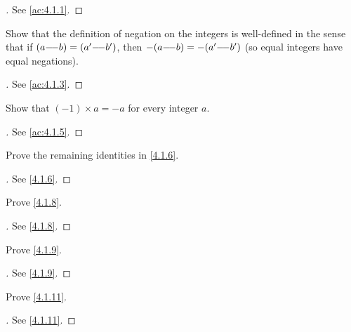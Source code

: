 \begin{proof}[]
  See \cref{ac:4.1.1}.
\end{proof}

\begin{ex}\label{ex:4.1.2}
  Show that the definition of negation on the integers is well-defined in the sense that if \((a {-}\!{-} b) = (a' {-}\!{-} b')\), then \(-(a {-}\!{-} b) = -(a' {-}\!{-} b')\)
  (so equal integers have equal negations).
\end{ex}

\begin{proof}[]
  See \cref{ac:4.1.3}.
\end{proof}

\begin{ex}\label{ex:4.1.3}
  Show that \((-1) \times a = -a\) for every integer \(a\).
\end{ex}

\begin{proof}[]
  See \cref{ac:4.1.5}.
\end{proof}

\begin{ex}\label{ex:4.1.4}
  Prove the remaining identities in \cref{4.1.6}.
\end{ex}

\begin{proof}[]
  See \cref{4.1.6}.
\end{proof}

\begin{ex}\label{ex:4.1.5}
  Prove \cref{4.1.8}.
\end{ex}

\begin{proof}[]
  See \cref{4.1.8}.
\end{proof}

\begin{ex}\label{ex:4.1.6}
  Prove \cref{4.1.9}.
\end{ex}

\begin{proof}[]
  See \cref{4.1.9}.
\end{proof}

\begin{ex}\label{ex:4.1.7}
  Prove \cref{4.1.11}.
\end{ex}

\begin{proof}[]
  See \cref{4.1.11}.
\end{proof}


